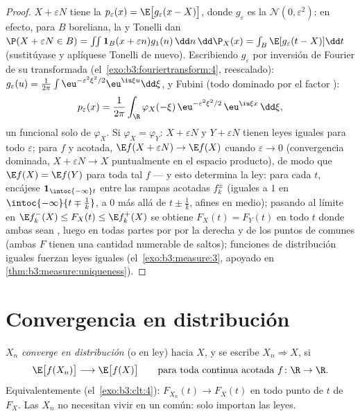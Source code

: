 \begin{proof}
$X + \varepsilon N$ tiene la 
$p_\varepsilon(x) =
\E\bigl[g_\varepsilon(x - X)\bigr]$, donde $g_\varepsilon$ es la
 $\mathcal N(0, \varepsilon^2)$:
en efecto, para $B$ boreliana, la
 y Tonelli dan
$\P(X + \varepsilon N \in
B) = \int\!\!\int\mathbf 1_B(x + \varepsilon
n)g_1(n)\,\dd n\,\dd\P_X(x) = \int_B\E[g_\varepsilon(t -
X)]\dd t$ (sustitúyase y aplíquese Tonelli de nuevo). Escribiendo
$g_\varepsilon$ por inversión de Fourier de su transformada
(el~\cref{exo:b3:fouriertransform:4}, reescalado):
$g_\varepsilon(u) = \frac1{2\pi}\int
\eu^{-\varepsilon^2\xi^2/2}\eu^{\iu\xi u}\dd\xi$, y Fubini (todo
dominado por el factor ):
\[
p_\varepsilon(x) = \frac1{2\pi}\int_\R
\varphi_X(-\xi)\,\eu^{-\varepsilon^2\xi^2/2}\,
\eu^{\iu\xi x}\,\dd\xi ,
\]
un funcional solo de $\varphi_X$. Si $\varphi_X =
\varphi_Y$: $X + \varepsilon N$ y $Y + \varepsilon N$ tienen leyes
iguales para todo $\varepsilon$; para $f$
 y acotada,
$\E f(X + \varepsilon N) \to \E f(X)$ cuando $\varepsilon
\to 0$ (convergencia dominada, $X + \varepsilon N \to X$ puntualmente en
el espacio producto), de modo que $\E f(X) = \E f(Y)$ para toda tal $f$
--- y esto determina la ley: para cada $t$, encájese
$\mathbf 1_{\intoc{-\infty}t}$ entre las rampas
 acotadas $f_k^\pm$
(iguales a $1$ en $\intoc{-\infty}{t \mp \frac1k}$, a $0$ más allá de
$t \pm
\frac1k$, afines en medio); pasando al límite en $\E
f_k^-(X) \leq F_X(t) \leq \E f_k^+(X)$ se obtiene $F_X(t) =
F_Y(t)$ en todo $t$ donde ambas sean
, luego en todas partes
por  por la derecha y
 de los puntos de
 comunes (ambas $F$
tienen una cantidad numerable de saltos); funciones de distribución
iguales fuerzan leyes iguales (el~\cref{exo:b3:measure:3}, apoyado en
\cref{thm:b3:measure:uniqueness}).
\end{proof}

\section{Convergencia en distribución}

\begin{definition}\label{def:b3:clt:cid}
$X_n$ \emph{converge en distribución} (o en ley) hacia $X$, y se escribe
$X_n \Rightarrow X$, si
\[
\E\bigl[f(X_n)\bigr] \longrightarrow \E\bigl[f(X)\bigr]
\qquad\text{para toda continua acotada } f\colon\R\to\R .
\]
Equivalentemente (el~\cref{exo:b3:clt:4}): $F_{X_n}(t) \to F_X(t)$ en
todo punto de  $t$ de
$F_X$. Las $X_n$ no necesitan vivir en un
 común: solo
importan las leyes.
\end{definition}

